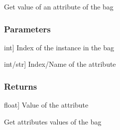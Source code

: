 \documentclass[letterpaper,10pt,english]{sphinxmanual}
\begin{document}
\begin{fulllineitems}
\begin{fulllineitems}
\begin{description}
\end{description}

\end{fulllineitems}


\begin{fulllineitems}
\label{\detokenize{data/_autosummary/miml.data.bag.Bag:miml.data.bag.Bag.get_attribute}}
\pysigstartsignatures
{}
\pysigstopsignatures
\sphinxAtStartPar
Get value of an attribute of the bag


\subsubsection{Parameters}
\label{\detokenize{data/_autosummary/miml.data.bag.Bag:id4}}\begin{description}
\sphinxlineitem{instance}{[}int{]}
\sphinxAtStartPar
Index of the instance in the bag

\sphinxlineitem{attribute}{[}int/str{]}
\sphinxAtStartPar
Index/Name of the attribute

\end{description}


\subsubsection{Returns}
\label{\detokenize{data/_autosummary/miml.data.bag.Bag:returns}}\begin{description}
\sphinxlineitem{value}{[}float{]}
\sphinxAtStartPar
Value of the attribute

\end{description}

\end{fulllineitems}


\begin{fulllineitems}
\label{\detokenize{data/_autosummary/miml.data.bag.Bag:miml.data.bag.Bag.get_attributes}}
\pysigstartsignatures
{}
\pysigstopsignatures
\sphinxAtStartPar
Get attributes values of the bag



\end{fulllineitems}
\end{fulllineitems}
\end{document}
